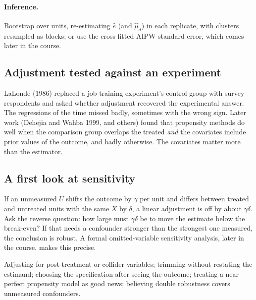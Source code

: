 \documentclass[11pt]{article}
\begin{document}
\paragraph{Inference.} Bootstrap over units, re-estimating $\hat e$ (and $\hat\mu_d$) in each replicate, with clusters resampled as
blocks; or use the cross-fitted AIPW standard error, which comes later in the course.

\subsection{Adjustment tested against an experiment}

LaLonde (1986) replaced a job-training experiment's control group with survey respondents and asked whether adjustment recovered
the experimental answer. The regressions of the time missed badly, sometimes with the wrong sign. Later work (Dehejia and Wahba
1999, and others) found that propensity methods do well when the comparison group overlaps the treated \emph{and} the covariates include prior values of the outcome,
and badly otherwise. The covariates matter more than the estimator.

\subsection{A first look at sensitivity}

If an unmeasured $U$ shifts the outcome by $\gamma$ per unit and differs between treated and untreated units with the same $X$ by
$\delta$, a linear adjustment is off by about $\gamma\delta$. Ask the reverse question: how large must $\gamma\delta$ be to move the
estimate below the break-even? If that needs a confounder stronger than the strongest one measured, the conclusion is robust.
A formal omitted-variable sensitivity analysis, later in the course, makes this precise.

\begin{pitfall}
Adjusting for post-treatment or collider variables; trimming without restating the estimand; choosing the specification after
seeing the outcome; treating a near-perfect propensity model as good news; believing double robustness covers unmeasured
confounders.
\end{pitfall}

\sectiontwo
\end{document}
